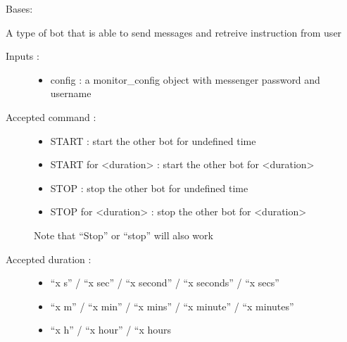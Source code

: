\documentclass[letterpaper,10pt,english]{sphinxmanual}
\begin{document}
\begin{fulllineitems}
\label{\detokenize{my_tools.monitoring:my_tools.monitoring.bot.Monitor_Bot}}
\sphinxAtStartPar
Bases: 

\sphinxAtStartPar
A type of bot that is able to send messages and retreive instruction from user
\begin{description}
\item[{Inputs :}] \leavevmode\begin{itemize}
\item {} 
\sphinxAtStartPar
config : a monitor\_config object with messenger password and username

\end{itemize}

\item[{Accepted command :}] \leavevmode\begin{itemize}
\item {} 
\sphinxAtStartPar
START : start the other bot for undefined time

\item {} 
\sphinxAtStartPar
START for \textless{}duration\textgreater{} : start the other bot for \textless{}duration\textgreater{}

\item {} 
\sphinxAtStartPar
STOP : stop the other bot for undefined time

\item {} 
\sphinxAtStartPar
STOP for \textless{}duration\textgreater{} : stop the other bot for \textless{}duration\textgreater{}

\end{itemize}

\sphinxAtStartPar
Note that “Stop” or “stop” will also work

\item[{Accepted duration :}] \leavevmode\begin{itemize}
\item {} 
\sphinxAtStartPar
“x s” /  “x sec” / “x second” / “x seconds” / “x secs”

\item {} 
\sphinxAtStartPar
“x m” / “x min” / “x mins” / “x minute” / “x minutes”

\item {} 
\sphinxAtStartPar
“x h” / “x hour” / “x hours


\end{itemize}
\end{description}
\end{fulllineitems}
\end{document}
